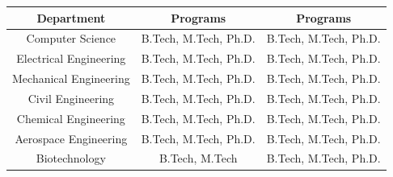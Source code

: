 \documentclass{article}
\begin{document}
\begin{tabular}{|c|c|c|}
    \hline
    Department & Programs & Programs \\
    \hline
    Computer Science & B.Tech, M.Tech, Ph.D. & B.Tech, M.Tech, Ph.D. \\
    Electrical Engineering & B.Tech, M.Tech, Ph.D. & B.Tech, M.Tech, Ph.D. \\
    Mechanical Engineering & B.Tech, M.Tech, Ph.D. & B.Tech, M.Tech, Ph.D. \\
    Civil Engineering & B.Tech, M.Tech, Ph.D. & B.Tech, M.Tech, Ph.D. \\
    Chemical Engineering & B.Tech, M.Tech, Ph.D. & B.Tech, M.Tech, Ph.D. \\
    Aerospace Engineering & B.Tech, M.Tech, Ph.D. & B.Tech, M.Tech, Ph.D. \\
    Biotechnology & B.Tech, M.Tech & B.Tech, M.Tech, Ph.D. \\
    \hline
\end{tabular}
\end{document}
